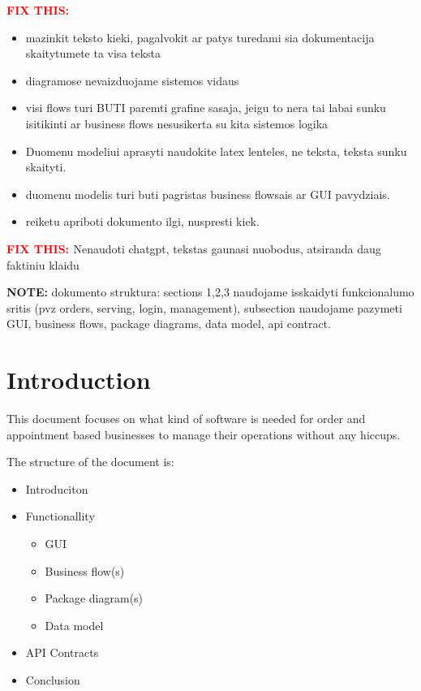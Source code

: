 \documentclass[]{VUMIFTemplateClass}
\newcommand{\warningcomment}[1]{%
    \begin{tcolorbox}[colback=yellow!90, colframe=red, arc=0pt, outer arc=0pt, boxrule=2pt, left=5pt, right=5pt, top=5pt, bottom=5pt]
        \Large\textbf{\textcolor{red}{FIX THIS: }} \normalsize #1
    \end{tcolorbox}
}
\newcommand{\noticecomment}[1]{%
    \begin{tcolorbox}[colback=blue!20, colframe=blue!60, arc=0pt, outer arc=0pt, boxrule=1pt, left=3pt, right=3pt, top=3pt, bottom=3pt]
        \textbf{\textcolor{blue!70!black}{NOTE:}} #1
    \end{tcolorbox}
}
\begin{document}

\onehalfspacing


\tableofcontents
\onehalfspacing


\warningcomment{
\begin{itemize}
    \item mazinkit teksto kieki, pagalvokit ar patys turedami sia dokumentacija skaitytumete ta visa teksta
    \item diagramose nevaizduojame sistemos vidaus
    \item visi flows turi BUTI paremti grafine sasaja, jeigu to nera tai labai sunku isitikinti ar business flows nesusikerta su kita sistemos logika
    \item Duomenu modeliui aprasyti naudokite latex lenteles, ne teksta, teksta sunku skaityti.
    \item duomenu modelis turi buti pagristas business flowsais ar GUI pavydziais.
    \item reiketu apriboti dokumento ilgi, nuspresti kiek.
\end{itemize}
}

\warningcomment{Nenaudoti chatgpt, tekstas gaunasi nuobodus, atsiranda daug faktiniu klaidu}

\noticecomment{dokumento struktura: sections 1,2,3 naudojame isskaidyti funkcionalumo sritis (pvz orders, serving, login, management), subsection naudojame pazymeti GUI, business flows, package diagrams, data model, api contract.}


\section*{Introduction}
This document focuses on what kind of software is needed for order and appointment based businesses to manage their operations without any hiccups.

The structure of the document is:
\begin{itemize}
    \item Introduciton
    \item Functionallity \begin{itemize}
        \item GUI
        \item Business flow(s)
        \item Package diagram(s)
        \item Data model    
    \end{itemize}
    \item API Contracts
    \item Conclusion
\end{itemize}
\end{document}
